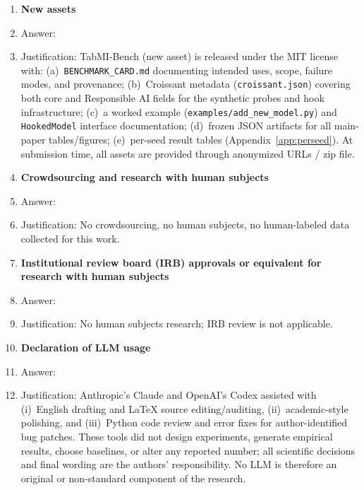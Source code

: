 \documentclass{article}
\begin{document}
\begin{enumerate}
\item {\bf New assets}
    \item[] Answer: \answerYes{}
    \item[] Justification: TabMI-Bench (new asset) is released under the MIT license with: (a)~\texttt{BENCHMARK\_CARD.md} documenting intended uses, scope, failure modes, and provenance; (b)~Croissant metadata (\texttt{croissant.json}) covering both core and Responsible AI fields for the synthetic probes and hook infrastructure; (c)~a worked example (\texttt{examples/add\_new\_model.py}) and \texttt{HookedModel} interface documentation; (d)~frozen JSON artifacts for all main-paper tables/figures; (e)~per-seed result tables (Appendix~\ref{app:perseed}). At submission time, all assets are provided through anonymized URLs / zip file.

\item {\bf Crowdsourcing and research with human subjects}
    \item[] Answer: \answerNA{}
    \item[] Justification: No crowdsourcing, no human subjects, no human-labeled data collected for this work.

\item {\bf Institutional review board (IRB) approvals or equivalent for research with human subjects}
    \item[] Answer: \answerNA{}
    \item[] Justification: No human subjects research; IRB review is not applicable.

\item {\bf Declaration of LLM usage}
    \item[] Answer: \answerNA{}
    \item[] Justification: Anthropic's Claude and OpenAI's Codex assisted with (i)~English drafting and \LaTeX{} source editing/auditing, (ii)~academic-style polishing, and (iii)~Python code review and error fixes for author-identified bug patches. These tools did not design experiments, generate empirical results, choose baselines, or alter any reported number; all scientific decisions and final wording are the authors' responsibility. No LLM is therefore an original or non-standard component of the research.

\end{enumerate}
\end{document}

